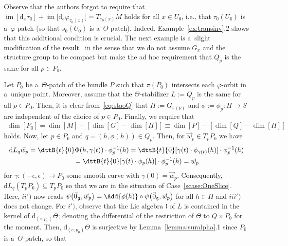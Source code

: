 \documentclass[pdftex]{sigma}
\numberwithin{equation}{section}
\begin{document}
Observe that the authors forgot to require that $\operatorname{\mathrm{im}}[\mathrm{d}_x\tau_0] +
\operatorname{\mathrm{im}}\big[\mathrm{d}_e\varphi_{\tau_0(x)}\big]=T_{\tau_0(x)}M$ holds for all $x\in U_0$, i.e., that
$\tau_0(U_0)$ is a~$\varphi$-patch (so that $s_0(U_0)$ is a~$\Theta$-patch).
Indeed, Example~\ref{ex:transinv}.2 shows that this additional condition is crucial.
The next example is a~slight modif\/ication of the result~\cite{HarSni} in the sense that we do not assume $G_x$ and the
structure group to be compact but make the ad hoc requirement that $Q_p$ is the same for all $p\in P_0$.

\begin{Example}\label{example:SCHSV}
Let $P_0$ be a~$\Theta$-patch of the bundle $P$ such that $\pi(P_0)$ intersects each $\varphi$-orbit in a~unique point. Moreover, assume that the $\Theta$-stabilizer $L:=Q_{p}$ is the same for all $p\in P_0$.
Then, it is clear from~\eqref{eq:staoQ} that $H:=G_{\pi(p)}$ and $\phi:=\phi_{p}\colon H \rightarrow S$ are independent
of the choice of $p\in P_0$.
Finally, we require that
\begin{gather}
\label{eq:dimP}
\dim[P_0]=\dim[M]-[\dim[G]-\dim[H]] \equiv\dim[P]-[\dim[Q]-\dim[H]]
\end{gather}
holds. Now, let $p\in P_0$ and $q=(h,\phi(h))\in Q_p$.
Then, for $\vec{w}_{p}\in T_{p}P_0$ we have
\begin{gather*}
\mathrm{d} L_q\vec{w}_{p}=\dttB{t}{0} \Phi(h,\gamma(t))\cdot \phi^{-1}_{p}(h)
=\dttB{t}{0} [\gamma(t)\cdot\phi_{\gamma(t)}(h)]\cdot \phi^{-1}_{p}(h)
\\
\phantom{\mathrm{d} L_q\vec{w}_{p}}
=\dttB{t}{0} [\gamma(t)\cdot \phi_{p}(h)]\cdot \phi^{-1}_{p}(h)=\vec{w}_{p}
\end{gather*}
for $\gamma\colon (-\epsilon,\epsilon)\rightarrow P_0$ some smooth curve with $\dot\gamma(0)=\vec{w}_{p}$.
Consequently, $\mathrm{d} L_q(T_pP_0)\subseteq T_pP_0$ so that we are in the situation of Case~\ref{scase:OneSlice}.
Here, $ii')$ now reads
$\psi\big(\vec{0}_{\mathfrak{g}},\vec{w}_{p}\big)=\Add{\phi(h)}\circ\psi\big(\vec{0}_{\mathfrak{g}},\vec{w}_{p}\big)$
for all $h\in H$ and $iii')$ does not change.
For $i')$, observe that the Lie algebra $\mathfrak{l}$ of $L$ is contained in the kernel of
$\mathrm{d}_{(e,p_0)}\Theta$; denoting the differential of the restriction of $\Theta$ to $Q\times P_0$ for the moment.
Then, $\mathrm{d}_{(e,p_0)}\Theta$ is surjective by Lemma~\ref{lemma:suralpha}.1 since $P_0$ is a~$\Theta$-patch, so that
\begin{gather*}

\end{gather*}
\end{Example}
\end{document}
